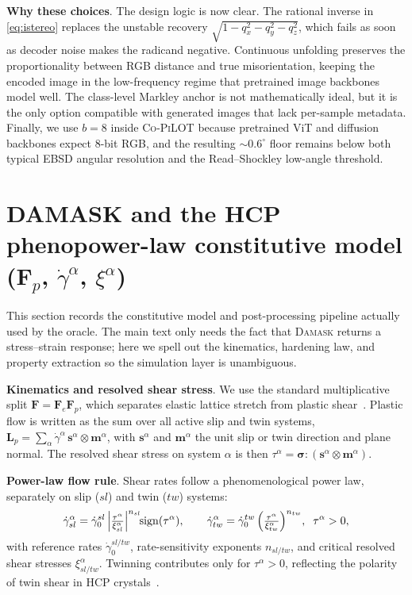 \documentclass{article}
\newcommand{\Co}{\textsc{Co-PiLOT}}
\newcommand{\damask}{\textsc{Damask}}
\begin{document}
\textbf{Why these choices}. The design logic is now clear. The rational inverse in \eqref{eq:istereo} replaces the unstable recovery $\sqrt{1-q_x^2-q_y^2-q_z^2}$, which fails as soon as decoder noise makes the radicand negative. Continuous unfolding preserves the proportionality between RGB distance and true misorientation, keeping the encoded image in the low-frequency regime that pretrained image backbones model well. The class-level Markley anchor is not mathematically ideal, but it is the only option compatible with generated images that lack per-sample metadata. Finally, we use $b{=}8$ inside \Co{} because pretrained ViT and diffusion backbones expect 8-bit RGB, and the resulting $\sim 0.6^\circ$ floor remains below both typical EBSD angular resolution and the Read--Shockley low-angle threshold.

\section{DAMASK and the HCP phenopower-law constitutive model ($\mathbf{F}_p$, $\dot\gamma^\alpha$, $\xi^\alpha$)}
\label{app:damask}

This section records the constitutive model and post-processing pipeline actually used by the oracle. The main text only needs the fact that \damask{} returns a stress--strain response; here we spell out the kinematics, hardening law, and property extraction so the simulation layer is unambiguous.

\textbf{Kinematics and resolved shear stress}. We use the standard multiplicative split $\mathbf{F}=\mathbf{F}_e\mathbf{F}_p$, which separates elastic lattice stretch from plastic shear~\citep{Wang2021}. Plastic flow is written as the sum over all active slip and twin systems,
$\mathbf{L}_p = \sum_\alpha \dot\gamma^\alpha\, \mathbf{s}^\alpha \otimes \mathbf{m}^\alpha$,
with $\mathbf{s}^\alpha$ and $\mathbf{m}^\alpha$ the unit slip or twin direction and plane normal. The resolved shear stress on system $\alpha$ is then $\tau^\alpha = \boldsymbol{\sigma}\!:\!(\mathbf{s}^\alpha\otimes\mathbf{m}^\alpha)$.

\textbf{Power-law flow rule}. Shear rates follow a phenomenological power law, separately on slip ($sl$) and twin ($tw$) systems:
\begin{equation}
  \dot\gamma^\alpha_{sl} = \dot\gamma_0^{sl}\,\Bigl|\tfrac{\tau^\alpha}{\xi^\alpha_{sl}}\Bigr|^{n_{sl}}\!\mathrm{sign}(\tau^\alpha),
  \qquad
  \dot\gamma^\alpha_{tw} = \dot\gamma_0^{tw}\,\Bigl(\tfrac{\tau^\alpha}{\xi^\alpha_{tw}}\Bigr)^{n_{tw}},\;\;\tau^\alpha > 0,
  \label{eq:phenopower-flow}
\end{equation}
with reference rates $\dot\gamma_0^{sl/tw}$, rate-sensitivity exponents $n_{sl/tw}$, and critical resolved shear stresses $\xi^\alpha_{sl/tw}$. Twinning contributes only for $\tau^\alpha>0$, reflecting the polarity of twin shear in HCP crystals~\citep{ActaMg2014}.
\end{document}

